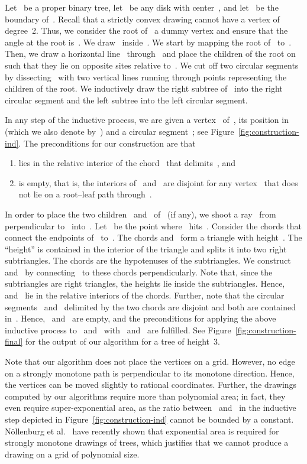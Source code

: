 \documentclass[a4paper,11pt]{article}
\theoremstyle{plain}
\begin{document}
Let~ be a proper binary tree, let~ be any disk with center~,
and let~ be the boundary of~.  Recall that a strictly convex
drawing cannot have a vertex of degree~2.  Thus, we consider the root
of~ a dummy vertex and ensure that the angle at the root
is~.  We draw~ inside~.  We start by  
mapping the root of~ to~.  Then, we draw a horizontal line~
through~ and place the children of the root on~ such that they lie on opposite sites relative to~.
We cut off two circular segments by dissecting~ with two vertical
lines running through points representing the children of the root.
We inductively draw the right subtree of~ into the right circular
segment and the left subtree into the left circular segment.

In any step of the inductive process, we are given a vertex~
of~, its position in~ (which we also denote by~) and a 
circular segment~; see Figure~\ref{fig:construction-ind}.  
The preconditions for our construction are that
\begin{enumerate}[label=(\roman*)]
  \item  lies in the relative interior of the chord~ that 
    delimits~, and
  \item  is empty, that is, the interiors of~ and~ are disjoint 
    for any vertex~ that does not lie on a root--leaf path through~.
\end{enumerate}
In order to place the two children~ and~ of~ (if any), we
shoot a ray~ from~ perpendicular to~ into~.
Let~ be the point where~ hits~.  Consider the chords
that connect the endpoints of~ to~.  The chords and~ form
a triangle with height~.  The ``height'' is contained in the interior of the 
triangle and splits it into two right subtriangles.  The chords are the
hypotenuses of the subtriangles.  We construct~ and~ by connecting~ to
these chords perpendicularly.  Note that, since the subtriangles are right 
triangles, the heights lie inside the subtriangles.  Hence,~ and~ lie in 
the relative interiors of the chords.  Further, note that the circular 
segments~ and~ delimited by the two chords are disjoint and
both are contained in~.  Hence,~ and~ are empty, and the
preconditions for applying the above inductive process to~ and~
with~ and~ are fulfilled.  See Figure~\ref{fig:construction-final} for 
the output of our algorithm for a tree of height~3.

Note that our algorithm does not place the vertices on a grid. However, 
no edge on a strongly monotone path is perpendicular to its monotone direction.
Hence, the vertices can be moved slightly to rational coordinates.
Further, the drawings computed by our algorithms require more than polynomial 
area; in fact, they even require super-exponential area, as the ratio 
between~ and~ in the inductive step depicted in 
Figure~\ref{fig:construction-ind} cannot be bounded by a constant.
N\"ollenburg et al.~\cite{npr-saicd-GD14} have recently shown that 
exponential area is required for strongly monotone drawings
of trees, which justifies that we cannot produce a drawing on a grid of
polynomial size.
\end{document}
